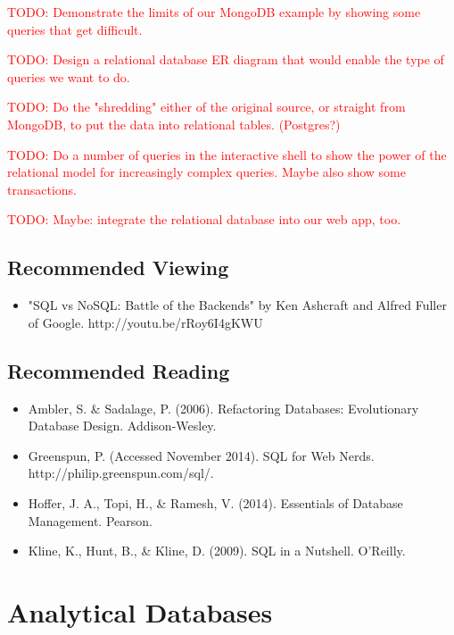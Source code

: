 \documentclass[11pt]{book}
\newcommand{\todo}[1]{\textcolor{red}{TODO: #1}} %
\begin{document}
\todo{Demonstrate the limits of our MongoDB example by showing some queries that get difficult.}

\todo{Design a relational database ER diagram that would enable the type of queries we want to do.}

\todo{Do the "shredding" either of the original source, or straight from MongoDB, to put the data into relational tables. (Postgres?)}

\todo{Do a number of queries in the interactive shell to show the power of the relational model for increasingly complex queries.  Maybe also show some transactions.}

\todo{Maybe: integrate the relational database into our web app, too.}

\section*{Recommended Viewing}
\begin{itemize}
    \item "SQL vs NoSQL: Battle of the Backends" by Ken Ashcraft and Alfred Fuller of Google.  http://youtu.be/rRoy6I4gKWU
\end{itemize}

\section*{Recommended Reading}
\begin{itemize}
    \item Ambler, S. \& Sadalage, P. (2006). Refactoring Databases: Evolutionary Database Design.  Addison-Wesley.
    \item Greenspun, P.  (Accessed November 2014). SQL for Web Nerds.\\ http://philip.greenspun.com/sql/.
    \item Hoffer, J. A., Topi, H., \& Ramesh, V. (2014). Essentials of Database Management.  Pearson.
    \item Kline, K., Hunt, B., \& Kline, D. (2009).  SQL in a Nutshell.  O'Reilly.
\end{itemize}









\chapter{Analytical Databases}\label{ch:olap}
\end{document}
